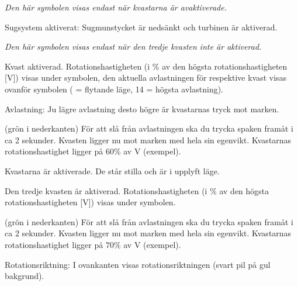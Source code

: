 {\em Den här symbolen visas endast när kvastarna är avaktiverade.}

\startSymVpad
{}
\SymVpad
{} Sugsystem aktiverat:
Sugmunstycket är nedsänkt och turbinen är aktiverad.
\stopSymVpad



{\em Den här symbolen visas endast när den tredje kvasten inte är aktiverad.}

\startSymVpad
{}
\SymVpad
{} Kvast aktiverad. Rotationshastigheten (i \% av den högsta rotationshastigheten [V]) visas under symbolen, den aktuella avlastningen för respektive kvast visas ovanför symbolen (\type{ } = flytande läge, 14 = högsta avlastning).

{\md Avlastning:} {\lt Ju lägre avlastning desto högre är kvastarnas tryck mot marken.}
\stopSymVpad


\startSymVpad
{}
\SymVpad
{}(grön i nederkanten)
För att slå från avlastningen ska du trycka spaken framåt i ca 2 sekunder. Kvasten ligger nu mot marken med hela sin egenvikt. Kvastarnas rotationshastighet ligger på 60\hairspace\% av V (exempel).
\stopSymVpad

\startSymVpad
{}
\SymVpad
{} Kvastarna är aktiverade. De står stilla och är i upplyft läge.
\stopSymVpad



\startSymVpad
{}
\SymVpad
{} Den tredje kvasten är aktiverad. Rotationshastigheten (i \% av den högsta rotationshastigheten [V]) visas under symbolen.
\stopSymVpad


\startSymVpad
{}
\SymVpad
{}(grön i nederkanten)
För att slå från avlastningen ska du trycka spaken framåt i ca 2 sekunder. Kvasten ligger nu mot marken med hela sin egenvikt. Kvastarnas rotationshastighet ligger på 70\hairspace\% av V (exempel).

{\md Rotationsriktning:} {\lt I ovankanten visas rotationsriktningen (svart pil på gul bakgrund).}
\stopSymVpad

\stopsection




